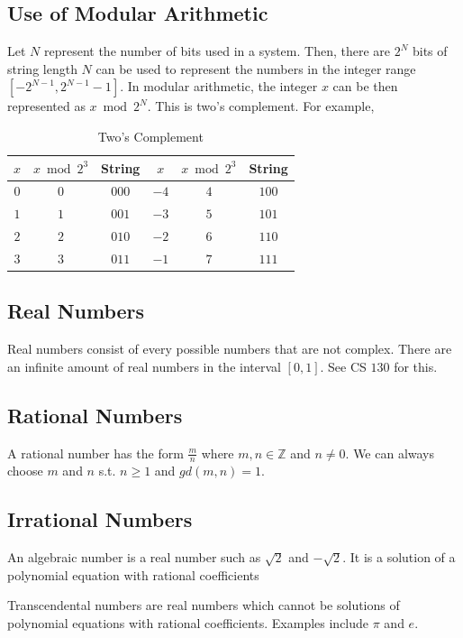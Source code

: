 \documentclass[a4paper]{article}
\theoremstyle{plain}
\theoremstyle{definition}
\newtheorem{defn}{Definition}[section]
\newtheorem{exmp}{Example}[section]
\theoremstyle{remark}
\begin{document}
\subsection{Use of Modular Arithmetic}
Let $N$ represent the number of bits used in a system. Then, there are $2^{N}$ bits of string length $N$ can be used to represent the numbers in the integer range $[-2^{N-1},2^{N-1}-1]$. In modular arithmetic, the integer $x$ can be then represented as $x \bmod 2^{N}$. This is two's complement. For example,
\begin{tcolorbox}[colback=black!3!white,colframe=black!60!white,title=\begin{exmp}Two's Complement \label{}\end{exmp}]
        
\begin{table}[H]
	\centering
	\caption{Two's Complement}
	\label{tab:two}
	\begin{tabular}{|c|c|c|c|c|c|}
		\hline
	$x$ & $x \bmod 2^{3}$ & String & $x$ & $x \bmod 2^{3}$ & String  \\
	\hline
	$0$ & $0$ & $000$ & $-4$ &$4$ & $100$ \\
	$1$ & $ 1$ & $ 001$ & $-3$ & $5$ & $101$ \\
	$2$ & $2$ & $010$ & $-2$ & $6$ & $110$ \\
	$3$ & $3$ & $ 011$ & $-1$ & $7$& $111$ \\
	\hline
	\end{tabular}
\end{table}
\end{tcolorbox}
\subsection{Real Numbers}
Real numbers consist of every possible numbers that are not complex. There are an infinite amount of real numbers in the interval $[0,1]$. See CS $130$ for this.
\subsection{Rational Numbers}
A rational number has the form $\frac{m}{n}$ where $m,n \in \mathbb{Z}$ and $n \neq 0$. We can always choose $ m$ and $n$ s.t. $n \ge 1$ and $gd(m,n)=1$.
\subsection{Irrational Numbers}
An algebraic number is a real number such as  $\sqrt{2}$ and $-\sqrt{2}  $. It is a solution of a polynomial equation with rational coefficients
\begin{tcolorbox}[colback=black!3!white,colframe=black!60!white,title=\begin{defn}Transcendental numbers \label{Transcendental numbers}\end{defn}]
Transcendental numbers are real numbers which cannot be solutions of polynomial equations with rational coefficients. Examples include $\pi$ and $e$.
\end{tcolorbox}
\end{document}
